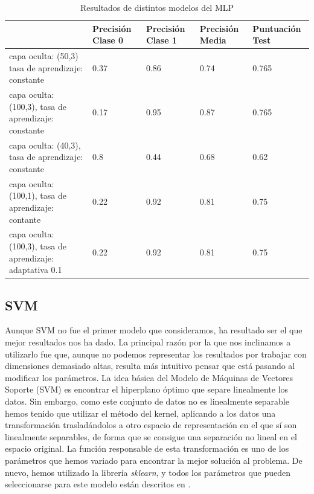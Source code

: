 \documentclass[journal,twoside]{JoPhA}
\begin{document}
\begin{table}[htb!]
	\begin{center}
		\caption{Resultados de distintos modelos del MLP}
		\begin{tabular}{| m{2.1cm} | m{1cm} | m{1cm} | m{1cm} | m{1.2cm} |}
			\hline
			& Precisión Clase 0 & Precisión Clase 1 & Precisión Media & Puntuación Test   \\ \hline
			capa oculta: (50,3) tasa de aprendizaje: constante & 0.37                & 0.86                & 0.74              & 0.765  \\ \hline
			capa oculta: (100,3), tasa de aprendizaje: constante & 0.17                & 0.95               & 0.87             & 0.765  \\ \hline
			capa oculta: (40,3), tasa de aprendizaje: constante & 0.8 & 0.44 & 0.68 & 0.62 \\ \hline
			capa oculta: (100,1), tasa de aprendizaje: contante & 0.22 & 0.92 & 0.81 & 0.75    \\ \hline
			capa oculta: (100,3), tasa de aprendizaje: adaptativa 0.1 & 0.22 & 0.92 & 0.81 & 0.75 \\ \hline
			
		\end{tabular}
		
		\label{tabla:tabla_mlp}
	\end{center}
\end{table}


\subsection{SVM}

Aunque SVM no fue el primer modelo que consideramos, ha resultado ser el que mejor resultados nos ha dado. La principal razón por la que nos inclinamos a utilizarlo fue que, aunque no podemos representar los resultados por trabajar con dimensiones demasiado altas, resulta más intuitivo pensar que está pasando al modificar los parámetros. La idea básica del Modelo de Máquinas de Vectores Soporte (SVM) es encontrar el hiperplano óptimo que separe linealmente los datos. Sin embargo, como este conjunto de datos no es linealmente separable hemos tenido que utilizar el método del kernel, aplicando a los datos una transformación trasladándolos a otro espacio de representación en el que sí son linealmente separables, de forma que se consigue una separación no lineal en el espacio original. La función responsable de esta transformación es uno de los parámetros que hemos variado para encontrar la mejor solución al problema. De nuevo, hemos utilizado la librería \textit{sklearn}, y todos los parámetros que pueden seleccionarse para este modelo están descritos en \cite{svm}. \\
\end{document}

